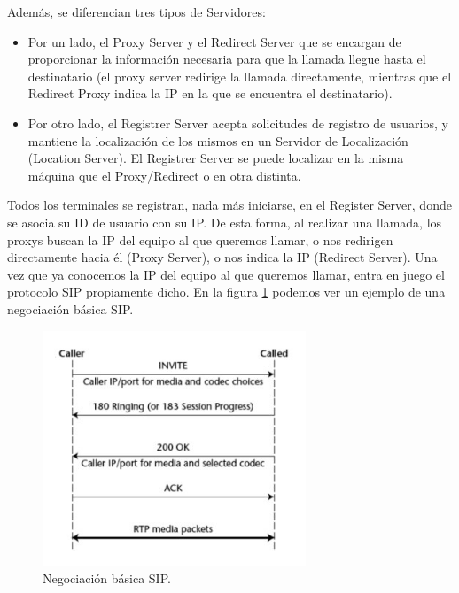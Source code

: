 \documentclass[a4paper]{article}
\begin{document}
Además, se diferencian tres tipos de Servidores:

\begin{itemize}
    \item Por un lado, el Proxy Server y el Redirect Server que se encargan de proporcionar la información necesaria para que la llamada llegue hasta el destinatario (el proxy server redirige la llamada directamente, mientras que el Redirect Proxy indica la IP en la que se encuentra el destinatario).
    
    \item Por otro lado, el Registrer Server acepta solicitudes de registro de usuarios, y mantiene la localización de los mismos en un Servidor de Localización (Location Server). El Registrer Server se puede localizar en la misma máquina que el Proxy/Redirect o en otra distinta. 
    
\end{itemize}  


Todos los terminales se registran, nada más iniciarse, en el Register Server, donde se asocia su ID de usuario con su IP. De esta forma, al realizar una llamada, los proxys buscan la IP del equipo al que queremos llamar, o nos redirigen directamente hacia él (Proxy Server), o nos indica la IP (Redirect Server).
Una vez que ya conocemos la IP del equipo al que queremos llamar, entra en juego el protocolo SIP propiamente dicho. En la figura \ref{fig:1} podemos ver un ejemplo de una negociación básica SIP.

\begin{figure}[htb]
\label{fig:1}
    \begin{center}
        \includegraphics[width=0.7\textwidth]{sip-register.jpg}
         \caption{Negociación básica SIP.}
    \end{center}
\end{figure}
\end{document}
